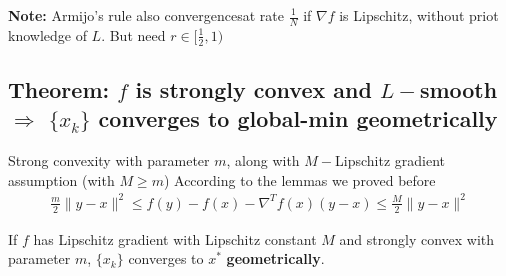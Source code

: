 \documentclass[11pt]{elegantbook}
\begin{document}
\textbf{Note: }Armijo's rule also convergencesat rate $\frac{1}{N}$ if $\nabla f$ is Lipschitz, without priot knowledge of $L$. But need $r\in[\frac{1}{2},1)$


\subsection{Theorem: $f$ is strongly convex and $L-$smooth $\Rightarrow$ $\{x_k\}$ converges to global-min geometrically}

Strong convexity with parameter $m$, along with $M-$Lipschitz gradient assumption (with $M\geq m$)
According to the lemmas we proved before
\begin{equation}
    \begin{aligned}
        \frac{m}{2}\|y-x\|^2\leq f(y)-f(x)-\nabla^T f(x)(y-x)\leq \frac{M}{2}\|y-x\|^2
    \end{aligned}
    \nonumber
\end{equation}

\begin{theorem}
    If $f$ has Lipschitz gradient with Lipschitz constant $M$ and strongly convex with parameter $m$, $\{x_k\}$ converges to $x^*$ \textbf{geometrically}.
\end{theorem}
\end{document}
